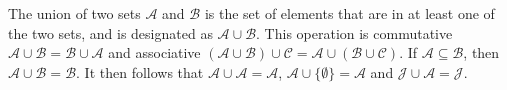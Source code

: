 \documentclass{article}
\begin{document}
The union of two sets $\mathcal{A}$ and $\mathcal{B}$ is the set of elements
that are in at least one of the two sets,  and is designated as
$\mathcal{A\cup B}$. This operation is commutative
$\mathcal{A\cup B = B\cup A}$ and associative $\mathcal{(A\cup B)\cup C =
A\cup(B\cup C)}$.  If $\mathcal{A\subseteq B}$, then
$\mathcal{A\cup B = B}$. It then follows that $\mathcal{A\cup A = A}$,
$\mathcal{A\cup\{\emptyset\} = A}$ and $\mathcal{J\cup A = J}$. 
\end{document}
